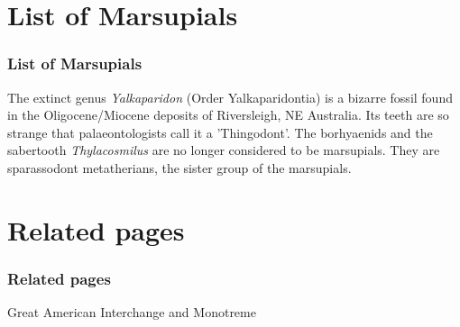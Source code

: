\documentclass{beamer}
\begin{document}
\section{List of Marsupials}

\begin{frame}
	\frametitle{List of Marsupials}
	The extinct genus \textit{Yalkaparidon} (Order Yalkaparidontia) is a bizarre fossil 
	found in the Oligocene/Miocene deposits of Riversleigh, NE Australia. 
	Its teeth are so strange that palaeontologists call it a 'Thingodont'.
	\newline \newline
	The borhyaenids and the sabertooth \textit{Thylacosmilus} are no longer considered
	to be marsupials. They are sparassodont metatherians, the sister group of
	the marsupials.
\end{frame}

\section{Related pages}
\begin{frame}
	\frametitle{Related pages}
    	Great American Interchange and Monotreme
\end{frame}
\end{document}
